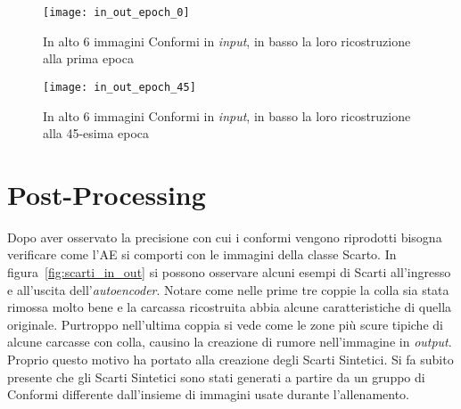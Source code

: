 \begin{figure}[ht] %
  \begin{center}
    \texttt{[image: in\_out\_epoch\_0]}
    \caption{In alto 6 immagini Conformi in \textit{input}, in basso la loro ricostruzione alla prima epoca}
    \label{fig:epoch_0}
  \end{center}
\end{figure}

\begin{figure}[ht] %
  \begin{center}
    \texttt{[image: in\_out\_epoch\_45]}
    \caption{In alto 6 immagini Conformi in \textit{input}, in basso la loro ricostruzione alla 45-esima epoca}
    \label{fig:epoch_45}
  \end{center}
\end{figure}

\clearpage
\section{Post-Processing}
Dopo aver osservato la precisione con cui i conformi vengono riprodotti bisogna verificare come l'AE si comporti con le immagini della classe Scarto.
In figura~\ref{fig:scarti_in_out} si possono osservare alcuni esempi di Scarti all'ingresso e all'uscita dell'\textit{autoencoder}.
Notare come nelle prime tre coppie la colla sia stata rimossa molto bene e la carcassa ricostruita abbia alcune caratteristiche di quella originale.
Purtroppo nell'ultima coppia si vede come le zone più scure tipiche di alcune carcasse con colla, causino la creazione di rumore nell'immagine in \textit{output}.
Proprio questo motivo ha portato alla creazione degli Scarti Sintetici.
Si fa subito presente che gli Scarti Sintetici sono stati generati a partire da un gruppo di Conformi differente dall'insieme di immagini usate durante l'allenamento.


